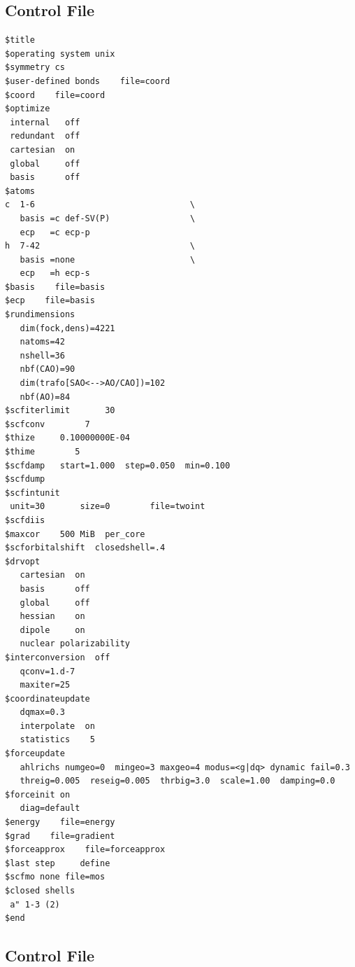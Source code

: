 \documentclass[aip]{revtex4-1}
\begin{document}
\subsection*{Control File}

\begin{verbatim}
$title
$operating system unix
$symmetry cs
$user-defined bonds    file=coord
$coord    file=coord
$optimize
 internal   off
 redundant  off
 cartesian  on
 global     off
 basis      off
$atoms
c  1-6                               \
   basis =c def-SV(P)                \
   ecp   =c ecp-p
h  7-42                              \
   basis =none                       \ 
   ecp   =h ecp-s 
$basis    file=basis 
$ecp    file=basis 
$rundimensions 
   dim(fock,dens)=4221 
   natoms=42 
   nshell=36 
   nbf(CAO)=90 
   dim(trafo[SAO<-->AO/CAO])=102 
   nbf(AO)=84 
$scfiterlimit       30 
$scfconv        7 
$thize     0.10000000E-04 
$thime        5 
$scfdamp   start=1.000  step=0.050  min=0.100 
$scfdump 
$scfintunit 
 unit=30       size=0        file=twoint 
$scfdiis 
$maxcor    500 MiB  per_core 
$scforbitalshift  closedshell=.4 
$drvopt 
   cartesian  on 
   basis      off 
   global     off 
   hessian    on 
   dipole     on 
   nuclear polarizability 
$interconversion  off 
   qconv=1.d-7 
   maxiter=25 
$coordinateupdate 
   dqmax=0.3 
   interpolate  on 
   statistics    5 
$forceupdate 
   ahlrichs numgeo=0  mingeo=3 maxgeo=4 modus=<g|dq> dynamic fail=0.3 
   threig=0.005  reseig=0.005  thrbig=3.0  scale=1.00  damping=0.0 
$forceinit on 
   diag=default 
$energy    file=energy 
$grad    file=gradient 
$forceapprox    file=forceapprox 
$last step     define 
$scfmo none file=mos 
$closed shells 
 a" 1-3 (2) 
$end 

\end{verbatim}

\subsection*{Control File}
\end{document}
